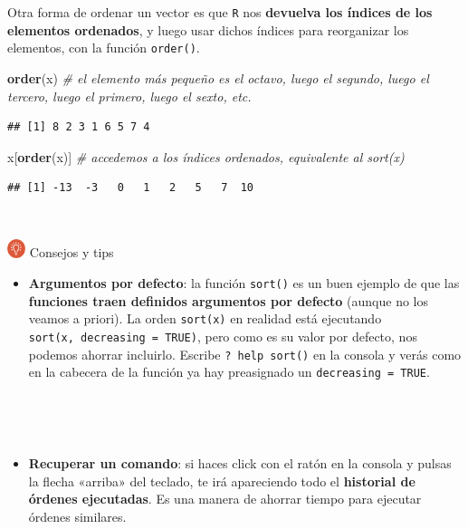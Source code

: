 \documentclass[11pt,]{book}
\newenvironment{Shaded}{\begin{snugshade}}{\end{snugshade}}
\newcommand{\CommentTok}[1]{\textcolor[rgb]{0.37,0.37,0.37}{\textit{#1}}}
\newcommand{\KeywordTok}[1]{\textcolor[rgb]{0.27,0.27,0.27}{\textbf{#1}}}
\newcommand{\NormalTok}[1]{#1}
\providecommand{\tightlist}{%
  \setlength{\itemsep}{0pt}\setlength{\parskip}{0pt}}
\begin{document}
Otra forma de ordenar un vector es que \texttt{R} nos \textbf{devuelva los índices de los elementos ordenados}, y luego usar dichos índices para reorganizar los elementos, con la función \texttt{order()}.

\begin{Shaded}
\begin{Highlighting}[]
\KeywordTok{order}\NormalTok{(x) }\CommentTok{# el elemento más pequeño es el octavo, luego el segundo, luego el tercero, luego el primero, luego el sexto, etc.}
\end{Highlighting}
\end{Shaded}

\begin{verbatim}
## [1] 8 2 3 1 6 5 7 4
\end{verbatim}

\begin{Shaded}
\begin{Highlighting}[]
\NormalTok{x[}\KeywordTok{order}\NormalTok{(x)] }\CommentTok{# accedemos a los índices ordenados, equivalente al sort(x)}
\end{Highlighting}
\end{Shaded}

\begin{verbatim}
## [1] -13  -3   0   1   2   5   7  10
\end{verbatim}

~

\includegraphics[width=0.04\textwidth,height=\textheight]{img/logo_info.png} Consejos y tips

\begin{itemize}
\tightlist
\item
  \textbf{Argumentos por defecto}: la función \texttt{sort()} es un buen ejemplo de que las \textbf{funciones traen definidos argumentos por defecto} (aunque no los veamos a priori). La orden \texttt{sort(x)} en realidad está ejecutando \texttt{sort(x,\ decreasing\ =\ TRUE)}, pero como es su valor por defecto, nos podemos ahorrar incluirlo. Escribe \texttt{?\ help\ sort()} en la consola y verás como en la cabecera de la función ya hay preasignado un \texttt{decreasing\ =\ TRUE}.
\end{itemize}

~

~

\begin{itemize}
\tightlist
\item
  \textbf{Recuperar un comando}: si haces click con el ratón en la consola y pulsas la flecha «arriba» del teclado, te irá apareciendo todo el \textbf{historial de órdenes ejecutadas}. Es una manera de ahorrar tiempo para ejecutar órdenes similares.
\end{itemize}
\end{document}
